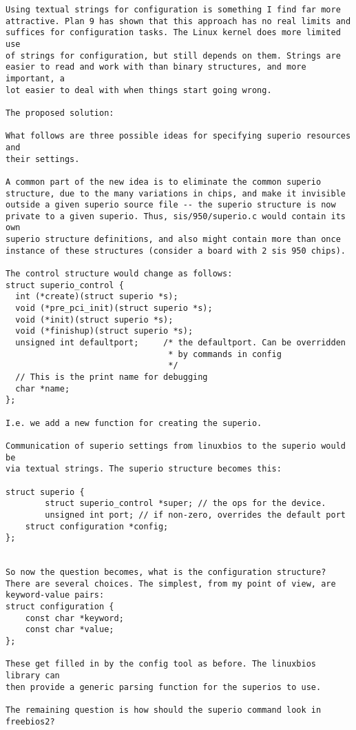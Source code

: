 \begin{verbatim}
Using textual strings for configuration is something I find far more
attractive. Plan 9 has shown that this approach has no real limits and
suffices for configuration tasks. The Linux kernel does more limited use
of strings for configuration, but still depends on them. Strings are
easier to read and work with than binary structures, and more important, a
lot easier to deal with when things start going wrong.

The proposed solution:

What follows are three possible ideas for specifying superio resources and
their settings.

A common part of the new idea is to eliminate the common superio
structure, due to the many variations in chips, and make it invisible
outside a given superio source file -- the superio structure is now
private to a given superio. Thus, sis/950/superio.c would contain its own
superio structure definitions, and also might contain more than once
instance of these structures (consider a board with 2 sis 950 chips).

The control structure would change as follows:
struct superio_control {
  int (*create)(struct superio *s);
  void (*pre_pci_init)(struct superio *s);
  void (*init)(struct superio *s);
  void (*finishup)(struct superio *s);
  unsigned int defaultport;     /* the defaultport. Can be overridden
                                 * by commands in config
                                 */
  // This is the print name for debugging
  char *name;
};

I.e. we add a new function for creating the superio.

Communication of superio settings from linuxbios to the superio would be
via textual strings. The superio structure becomes this:

struct superio {
        struct superio_control *super; // the ops for the device.
        unsigned int port; // if non-zero, overrides the default port
	struct configuration *config;
};


So now the question becomes, what is the configuration structure?
There are several choices. The simplest, from my point of view, are
keyword-value pairs:
struct configuration {
	const char *keyword;
	const char *value;
};

These get filled in by the config tool as before. The linuxbios library can
then provide a generic parsing function for the superios to use.

The remaining question is how should the superio command look in
freebios2?


\end{verbatim}
